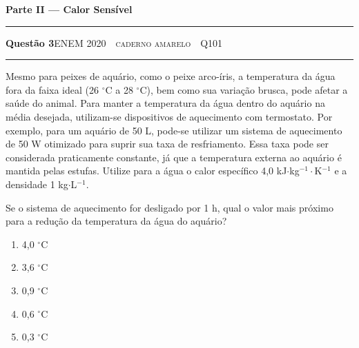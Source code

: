 \documentclass[11pt,a4paper]{article}
\newcommand{\fonte}[1]{{\small\scshape\color{grafite}#1}}
\newenvironment{questao}[2]{%
  \needspace{6\baselineskip}
  \par\addvspace{1.6em}
  {\large\bfseries\color{vinho}Quest\~ao #1}\hfill #2\\[-0.55em]
  {\color{black!25}\rule{\linewidth}{0.4pt}}
  \par\nobreak\smallskip
}{\par\addvspace{0.4em}}
\newcommand{\parte}[1]{%
  \needspace{7\baselineskip}
  \vspace{1.8em}
  {\Large\bfseries #1}\\[-0.55em]
  {\color{black!30}\rule{\linewidth}{0.5pt}}
  \par\nobreak\smallskip
}
\begin{document}
\parte{Parte II --- Calor Sens\'ivel}

\begin{questao}{3}{\fonte{ENEM 2020 \,\textperiodcentered\, caderno amarelo \,\textperiodcentered\, Q101}}
Mesmo para peixes de aqu\'ario, como o peixe arco-\'iris, a temperatura da
\'agua fora da faixa ideal (26 $^\circ$C a 28 $^\circ$C), bem como sua
varia\c{c}\~ao brusca, pode afetar a sa\'ude do animal. Para manter a
temperatura da \'agua dentro do aqu\'ario na m\'edia desejada, utilizam-se
dispositivos de aquecimento com termostato. Por exemplo, para um aqu\'ario
de 50 L, pode-se utilizar um sistema de aquecimento de 50 W otimizado
para suprir sua taxa de resfriamento. Essa taxa pode ser considerada
praticamente constante, j\'a que a temperatura externa ao aqu\'ario \'e
mantida pelas estufas. Utilize para a \'agua o calor espec\'ifico
4,0 kJ$\cdot$kg$^{-1}\cdot$K$^{-1}$ e a densidade 1 kg$\cdot$L$^{-1}$.

Se o sistema de aquecimento for desligado por 1 h, qual o valor mais
pr\'oximo para a redu\c{c}\~ao da temperatura da \'agua do aqu\'ario?
\begin{enumerate}
  \item 4,0 $^\circ$C
  \item 3,6 $^\circ$C
  \item 0,9 $^\circ$C
  \item 0,6 $^\circ$C
  \item 0,3 $^\circ$C
\end{enumerate}
\end{questao}
\end{document}
